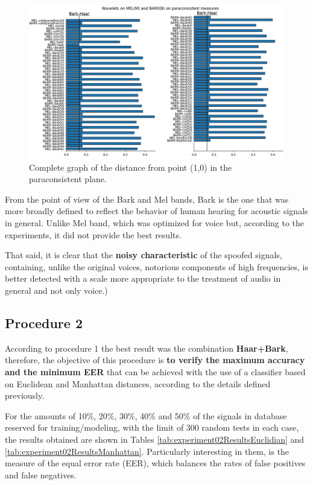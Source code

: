 		\begin{figure}[H]
			\centering
			\includegraphics[scale=.62]{images/results/paraconsistentPlane/ParaconsistentFull.png}
			\caption{Complete graph of the distance from point (1,0) in the paraconsistent plane.}
			\label{fig:paraconsistentfull}
		\end{figure}
	
		\par From the point of view of the Bark and Mel bands, Bark is the one that was more broadly defined to reflect the behavior of human hearing for acoustic signals in general. Unlike Mel band, which was optimized for voice but, according to the experiments, it did not provide the best results.\\
		\par That said, it is clear that the \textbf{noisy characteristic} of the spoofed signals, containing, unlike the original voices, notorious components of high frequencies, is better detected with a scale more appropriate to the treatment of audio in general and not only voice.)

	\subsection{Procedure 2} 
		\label{sec:testsResults:subsec:Experimento02}
		\par According to procedure 1 the best result was the combination \textbf{Haar+Bark}, therefore, the objective of this procedure is \textbf{to verify the maximum accuracy and the minimum EER} that can be achieved with the use of a classifier based on Euclidean and Manhattan distances, according to the details defined previously.\\
		
		\par For the amounts of 10\%, 20\%, 30\%, 40\% and 50\% of the signals in database reserved for training/modeling, with the limit of 300 random tests in each case, the results obtained are shown in Tables \ref{tab:experiment02ResultsEuclidian} and \ref{tab:experiment02ResultsManhattan}. Particularly interesting in them, is the measure of the equal error rate (EER), which balances the rates of false positives and false negatives.\\
		

